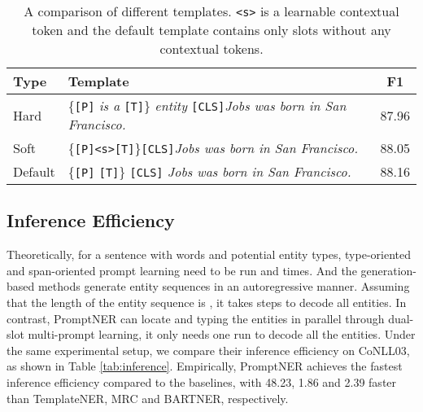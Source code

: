 \documentclass[11pt]{article}
\begin{document}
\begin{table}[!htp]
    \centering
    \small
    \begin{tabular}{>{\arraybackslash}p{0.7cm}>{\arraybackslash}p{4.1cm}c}
    \toprule
        Type & Template &  F1 \\ 
    \midrule
Hard & \multicolumn{1}{m{4.9cm}} {\{\texttt{[P]}\textit{ is a }\texttt{[T]}\}\textit{ entity }\texttt{[CLS]}\textit{Jobs was born in San Francisco.}}  & 87.96 \\
\midrule
Soft & \multicolumn{1}{m{4.9cm}} {\{\texttt{[P]}\texttt{<s>}\texttt{[T]}\}\texttt{[CLS]}\textit{Jobs was born in San Francisco.}}  & 88.05 \\
\midrule
Default & \multicolumn{1}{m{4.9cm}} {\{\texttt{[P]} \texttt{[T]}\} \texttt{[CLS]}\textit{ Jobs was born in San Francisco.}}  &  88.16 \\
    \bottomrule
    \end{tabular}
    \caption{A comparison of different templates. \texttt{<s>} is a learnable contextual token and the default template contains only slots without any contextual tokens.}
    \label{tab:template}
\end{table}




\subsection{Inference Efficiency}
Theoretically, for a sentence with  words and  potential entity types, type-oriented \citep{li-etal-2020-unified} and span-oriented \citep{cui-etal-2021-template} prompt learning need to be run  and  times.
And the generation-based methods \citep{yan-etal-2021-unified-generative} generate entity sequences in an autoregressive manner. Assuming that the length of the entity sequence is , it takes  steps to decode all entities.
In contrast, PromptNER can locate and typing the entities in parallel through dual-slot multi-prompt learning, it only needs one run to decode all the entities. Under the same experimental setup, we compare their inference efficiency on CoNLL03, as shown in Table \ref{tab:inference}. Empirically, PromptNER achieves the fastest inference efficiency compared to the baselines, with 48.23, 1.86 and 2.39 faster than TemplateNER, MRC and BARTNER, respectively.
\end{document}
